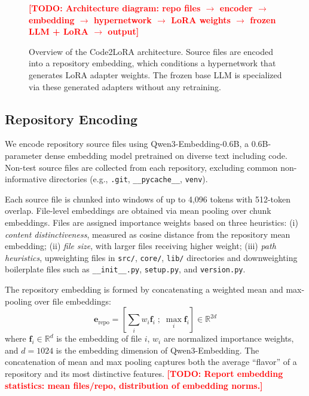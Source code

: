 \documentclass[11pt]{article}
\newcommand{\method}{Code2LoRA}
\newcommand{\todo}[1]{\textcolor{red}{\textbf{[TODO: #1]}}}
\begin{document}
\begin{figure}[t]
\centering
\todo{Architecture diagram: repo files $\to$ encoder $\to$ embedding $\to$ hypernetwork $\to$ LoRA weights $\to$ frozen LLM + LoRA $\to$ output}
\caption{Overview of the \method{} architecture. Source files are encoded into a repository embedding, which conditions a hypernetwork that generates LoRA adapter weights. The frozen base LLM is specialized via these generated adapters without any retraining.}
\label{fig:architecture}
\end{figure}

\subsection{Repository Encoding}
\label{sec:encoding}

We encode repository source files using Qwen3-Embedding-0.6B, a 0.6B-parameter dense embedding model pretrained on diverse text including code.
Non-test source files are collected from each repository, excluding common non-informative directories (e.g., \texttt{.git}, \texttt{\_\_pycache\_\_}, \texttt{venv}).

Each source file is chunked into windows of up to 4,096 tokens with 512-token overlap.
File-level embeddings are obtained via mean pooling over chunk embeddings.
Files are assigned importance weights based on three heuristics:
(i) \emph{content distinctiveness}, measured as cosine distance from the repository mean embedding;
(ii) \emph{file size}, with larger files receiving higher weight;
(iii) \emph{path heuristics}, upweighting files in \texttt{src/}, \texttt{core/}, \texttt{lib/} directories and downweighting boilerplate files such as \texttt{\_\_init\_\_.py}, \texttt{setup.py}, and \texttt{version.py}.

The repository embedding is formed by concatenating a weighted mean and max-pooling over file embeddings:
\begin{equation}
    \mathbf{e}_\text{repo} = \left[\sum_i w_i \mathbf{f}_i \;;\; \max_i \mathbf{f}_i\right] \in \mathbb{R}^{2d}
\label{eq:repo_emb}
\end{equation}
where $\mathbf{f}_i \in \mathbb{R}^{d}$ is the embedding of file $i$, $w_i$ are normalized importance weights, and $d = 1024$ is the embedding dimension of Qwen3-Embedding.
The concatenation of mean and max pooling captures both the average ``flavor'' of a repository and its most distinctive features.
\todo{Report embedding statistics: mean files/repo, distribution of embedding norms.}
\end{document}
